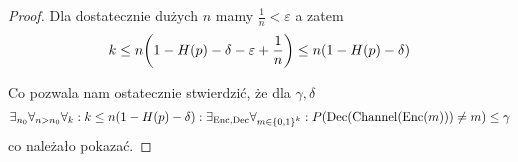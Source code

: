 \begin{proof}
    Dla dostatecznie dużych \( n \) mamy \( \frac{1}{n} < \varepsilon \) a zatem
    \[
        k \leq n \pars{1 - H(p) - \delta - \varepsilon + \frac{1}{n}} \leq n \pars{1 - H(p) - \delta}
    \]
    
    Co pozwala nam ostatecznie stwierdzić, że dla \( \gamma, \delta \)
    \begin{multline*}
         \exists_{n_0} \forall_{n > n_0}
        \forall_k : k \leq n \pars{1 - H(p) - \delta} :
                \exists_{\Enc, \Dec} \forall_{m \in \set{0, 1}^k} : 
                P\pars{\Dec(\Channel(\Enc(m))) \neq m} \leq \gamma
    \end{multline*}
    co należało pokazać.
\end{proof}